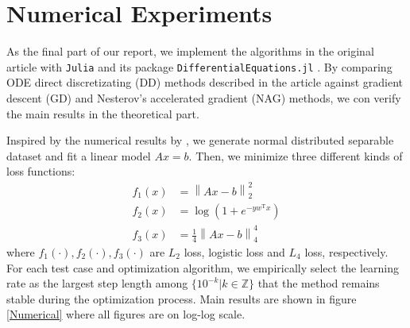 \section{Numerical Experiments}
As the final part of our report, we implement the algorithms in the original article with \texttt{Julia} and its package \texttt{DifferentialEquations.jl} \cite{rackauckas2017differentialequations}. By comparing ODE direct discretizating (DD) methods described in the article against gradient descent (GD) and Nesterov's accelerated gradient (NAG) methods, we con verify the main results in the theoretical part.

Inspired by the numerical results by \textcite{NEURIPS2019_7a2b33c6}, we generate normal distributed separable dataset and fit a linear model \(Ax=b\). Then, we minimize three different kinds of loss functions:
\begin{equation}
    \begin{aligned}
        f_1(x) & = \left\| Ax-b \right\|_{2}^2            \\
        f_2(x) & = \log(1+e^{-y w^{\mathrm{T}}x})         \\
        f_3(x) & = \frac{1}{4}\left\| Ax-b \right\|_{4}^4
    \end{aligned}
\end{equation}
where $f_1(\cdot ),f_2(\cdot ),f_3(\cdot )$ are $L_2$ loss, logistic loss and $L_4$ loss, respectively. For each test case and optimization algorithm, we empirically select the learning rate as the largest step length among $\{ 10^{-k}|k\in \mathbb{Z} \}$ that the method remains stable during the optimization process. Main results are shown in figure \ref{Numerical} where all figures are on log-log scale.
